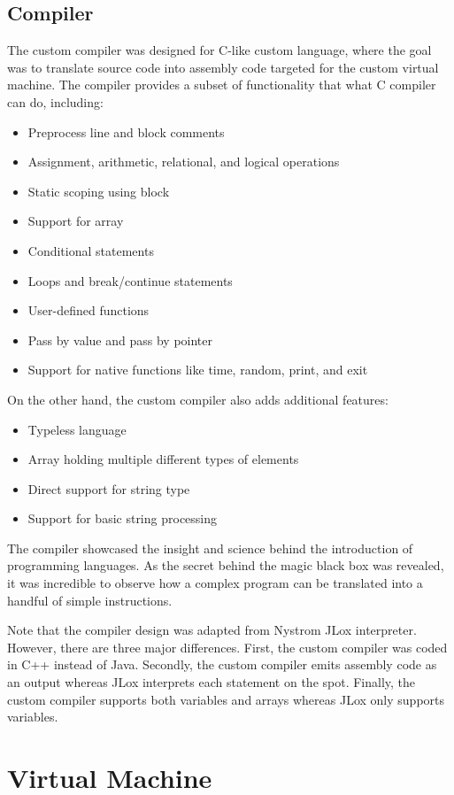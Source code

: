 \documentclass[manuscript,screen,nonacm]{acmart}
\begin{document}
\subsection{Compiler}
The custom compiler was designed for C-like custom language, where the goal was to translate source code into assembly code targeted for the custom virtual machine. The compiler provides a subset of functionality that what C compiler can do, including:
\begin{itemize}
    \item Preprocess line and block comments
    \item Assignment, arithmetic, relational, and logical operations
    \item Static scoping using block
    \item Support for array
    \item Conditional statements
    \item Loops and break/continue statements
    \item User-defined functions 
    \item Pass by value and pass by pointer
    \item Support for native functions like time, random, print, and exit
\end{itemize}
On the other hand, the custom compiler also adds additional features:
\begin{itemize}
    \item Typeless language
    \item Array holding multiple different types of elements
    \item Direct support for string type
    \item Support for basic string processing
\end{itemize}
The compiler showcased the insight and science behind the introduction of programming languages. As the secret behind the magic black box was revealed, it was incredible to observe how a complex program can be translated into a handful of simple instructions.

Note that the compiler design was adapted from Nystrom JLox interpreter\cite{Nystrom}. However, there are three major differences. First, the custom compiler was coded in C++ instead of Java. Secondly, the custom compiler emits assembly code as an output whereas JLox interprets each statement on the spot. Finally, the custom compiler supports both variables and arrays whereas JLox only supports variables.

\section{Virtual Machine}
\end{document}
